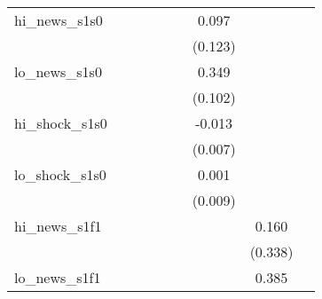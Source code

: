 {\begin{tabular}{l*{8}{c}}
\addlinespace
hi\_news\_s1s0&                     &                     &                     &                     &                     &       0.097         &                     &                     \\
            &                     &                     &                     &                     &                     &     (0.123)         &                     &                     \\
\addlinespace
lo\_news\_s1s0&                     &                     &                     &                     &                     &       0.349\sym{***}&                     &                     \\
            &                     &                     &                     &                     &                     &     (0.102)         &                     &                     \\
\addlinespace
hi\_shock\_s1s0&                     &                     &                     &                     &                     &      -0.013\sym{*}  &                     &                     \\
            &                     &                     &                     &                     &                     &     (0.007)         &                     &                     \\
\addlinespace
lo\_shock\_s1s0&                     &                     &                     &                     &                     &       0.001         &                     &                     \\
            &                     &                     &                     &                     &                     &     (0.009)         &                     &                     \\
\addlinespace
hi\_news\_s1f1&                     &                     &                     &                     &                     &                     &       0.160         &                     \\
            &                     &                     &                     &                     &                     &                     &     (0.338)         &                     \\
\addlinespace
lo\_news\_s1f1&                     &                     &                     &                     &                     &                     &       0.385         &                     \\

\end{tabular}}
